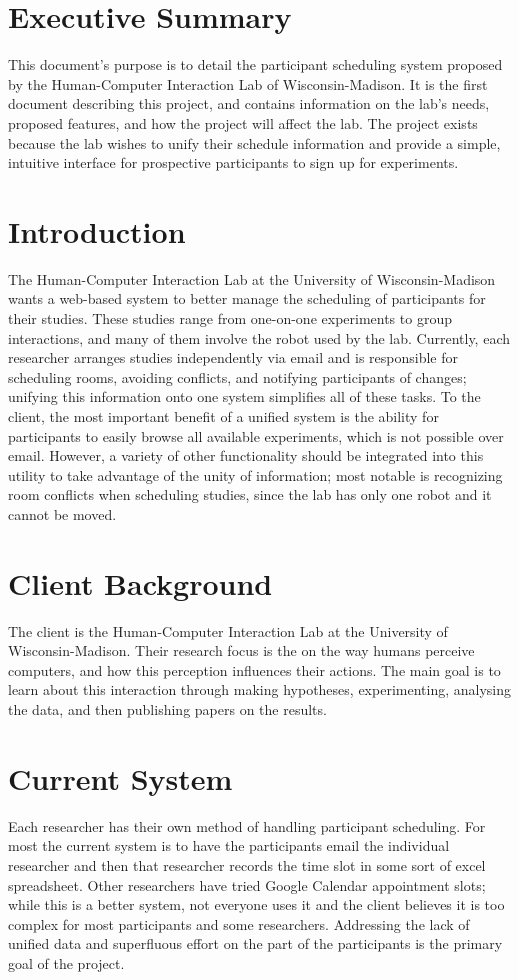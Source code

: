 \tableofcontents
\newpage

\section{Executive Summary}
This document's purpose is to detail the participant scheduling system proposed by the Human-Computer Interaction Lab of Wisconsin-Madison. It is the first document describing this project, and contains information on the lab's needs, proposed features, and how the project will affect the lab.  The project exists because the lab wishes to unify their schedule information and provide a simple, intuitive interface for prospective participants to sign up for experiments.

\section{Introduction}
The Human-Computer Interaction Lab at the University of Wisconsin-Madison wants a web-based system to better manage the scheduling of participants for their studies.  These studies range from one-on-one experiments to group interactions, and many of them involve the robot used by the lab.  Currently, each researcher arranges studies independently via email and is responsible for scheduling rooms, avoiding conflicts, and notifying participants of changes; unifying this information onto one system simplifies all of these tasks.  To the client, the most important benefit of a unified system is the ability for participants to easily browse all available experiments, which is not possible over email.  However, a variety of other functionality should be integrated into this utility to take advantage of the unity of information; most notable is recognizing room conflicts when scheduling studies, since the lab has only one robot and it cannot be moved.\cite{website:HCI}

\section{Client Background}
The client is the Human-Computer Interaction Lab at the University of Wisconsin-Madison. Their research focus is the on the way humans perceive computers, and how this perception influences their actions. The main goal is to learn about this interaction through making hypotheses, experimenting, analysing the data, and then publishing papers on the results.

\section{Current System}
Each researcher has their own method of handling participant scheduling. For most the current system is to have the participants email the individual researcher and then that researcher records the time slot in some sort of excel spreadsheet. Other researchers have tried Google Calendar appointment slots; while this is a better system, not everyone uses it and the client believes it is too complex for most participants and some researchers.  Addressing the lack of unified data and superfluous effort on the part of the participants is the primary goal of the project.

